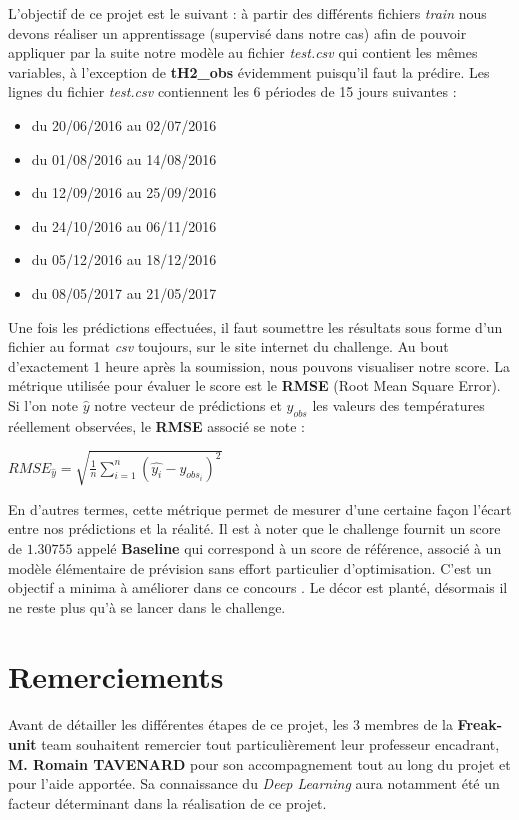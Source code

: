 \documentclass[14pt, openany]{article}
\begin{document}
L'objectif de ce projet est le suivant : à partir des différents fichiers \textit{train} nous devons réaliser un apprentissage (supervisé dans notre cas) afin de pouvoir appliquer par la suite notre modèle au fichier \textit{test.csv} qui contient les mêmes variables, à l'exception de \textbf{tH2\_obs} évidemment puisqu'il faut la prédire. Les lignes du fichier \textit{test.csv} contiennent les 6 périodes de 15 jours suivantes :
\begin{itemize}
\item du 20/06/2016 au 02/07/2016
\item du 01/08/2016 au 14/08/2016
\item du 12/09/2016 au 25/09/2016
\item du 24/10/2016 au 06/11/2016
\item du 05/12/2016 au 18/12/2016
\item du 08/05/2017 au 21/05/2017
\end{itemize}
Une fois les prédictions effectuées, il faut soumettre les résultats sous forme d'un fichier au format \textit{csv} toujours, sur le site internet du challenge. Au bout d'exactement 1 heure après la soumission, nous pouvons visualiser notre score. La métrique utilisée pour évaluer le score est le \textbf{RMSE} (Root Mean Square Error). Si l'on note $\hat{y}$ notre vecteur de prédictions et $y_{obs}$ les valeurs des températures réellement observées, le \textbf{RMSE} associé se note :\\
\begin{center}
$RMSE_{\hat{y}} = \sqrt{\frac{1}{n} \sum\limits_{i=1}^n (\hat{y_i}-y_{obs_i})^2}$
\end{center}
En d'autres termes, cette métrique permet de mesurer d'une certaine façon l'écart entre nos prédictions et la réalité. Il est à noter que le challenge fournit un score de $1.30755$ appelé \textbf{Baseline} qui correspond à un score de référence, associé à \og un modèle élémentaire de prévision sans effort particulier d'optimisation. C'est un objectif a minima à améliorer dans ce concours \fg{}. Le décor est planté, désormais il ne reste plus qu'à se lancer dans le challenge.
\section{Remerciements}
\paragraph{}
Avant de détailler les différentes étapes de ce projet, les 3 membres de la \textbf{Freak-unit} team souhaitent remercier tout particulièrement leur professeur encadrant, \textbf{M. Romain TAVENARD} pour son accompagnement tout au long du projet et pour l'aide apportée. Sa connaissance du \textit{Deep Learning} aura notamment été un facteur déterminant dans la réalisation de ce projet.
\end{document}
